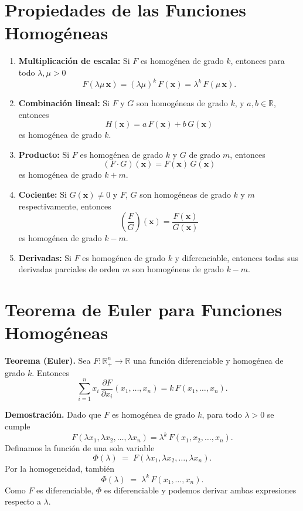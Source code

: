 \documentclass{article}
\begin{document}
\section*{Propiedades de las Funciones Homogéneas}
\begin{enumerate}
  \item \textbf{\color{teal}Multiplicación de escala:} Si \(F\) es homogénea de grado \(k\), entonces para todo \(\lambda,\mu>0\)
  \[
    F(\lambda\mu\,\mathbf{x})
    =(\lambda\mu)^k\,F(\mathbf{x})
    =\lambda^k\,F(\mu\,\mathbf{x}).
  \]
  \item \textbf{\color{teal}Combinación lineal:} Si \(F\) y \(G\) son homogéneas de grado \(k\), y \(a,b\in\mathbb{R}\), entonces
  \[
    H(\mathbf{x}) = a\,F(\mathbf{x}) + b\,G(\mathbf{x})
  \]
  es homogénea de grado \(k\).
  \item \textbf{\color{teal}Producto:} Si \(F\) es homogénea de grado \(k\) y \(G\) de grado \(m\), entonces
  \[
    (F\cdot G)(\mathbf{x})
    =F(\mathbf{x})\,G(\mathbf{x})
  \]
  es homogénea de grado \(k+m\).
  \item \textbf{\color{teal}Cociente:} Si \(G(\mathbf{x})\neq 0\) y \(F\), \(G\) son homogéneas de grado \(k\) y \(m\) respectivamente, entonces
  \[
    \left(\frac{F}{G}\right)(\mathbf{x})
    =\frac{F(\mathbf{x})}{G(\mathbf{x})}
  \]
  es homogénea de grado \(k-m\).
  \item \textbf{\color{teal} Derivadas:} Si \(F\) es homogénea de grado \(k\) y diferenciable, entonces todas sus derivadas parciales de orden \(m\) son homogéneas de grado \(k-m\).

\end{enumerate}


\section*{Teorema de Euler para Funciones Homogéneas}

\noindent\textbf{Teorema (Euler).}  
Sea \(F:\mathbb{R}^n_{+}\to\mathbb{R}\) una función diferenciable y homogénea de grado \(k\). Entonces
\[
\sum_{i=1}^n x_i \,\frac{\partial F}{\partial x_i}(x_1,\dots,x_n)
= k\,F(x_1,\dots,x_n).
\]

\medskip
\noindent\textbf{Demostración.}  
Dado que \(F\) es homogénea de grado \(k\), para todo \(\lambda>0\) se cumple
\[
F(\lambda x_1,\lambda x_2,\dots,\lambda x_n)
= \lambda^k \, F(x_1,x_2,\dots,x_n).
\]
Definamos la función de una sola variable
\[
\Phi(\lambda) \;=\; F(\lambda x_1,\lambda x_2,\dots,\lambda x_n).
\]
Por la homogeneidad, también
\[
\Phi(\lambda) \;=\; \lambda^k\,F(x_1,\dots,x_n).
\]
Como \(F\) es diferenciable, \(\Phi\) es diferenciable y podemos derivar ambas expresiones respecto a \(\lambda\).  
\end{document}
